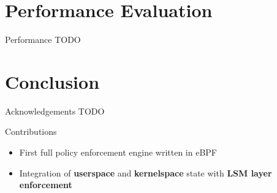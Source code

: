 \documentclass[12pt, dvipsnames]{beamer}
\begin{document}
\section{Performance Evaluation}

\begin{frame}[t]{Performance}
TODO
\end{frame}

\section{Conclusion}

\begin{frame}[t]{Acknowledgements}
TODO
\end{frame}

\begin{frame}[t]{Contributions}
\begin{itemize}
    \item First full policy enforcement engine written in eBPF
    \item Integration of \textbf{userspace} and \textbf{kernelspace} state with \textbf{LSM layer enforcement}
\end{itemize}
\end{frame}
\end{document}
